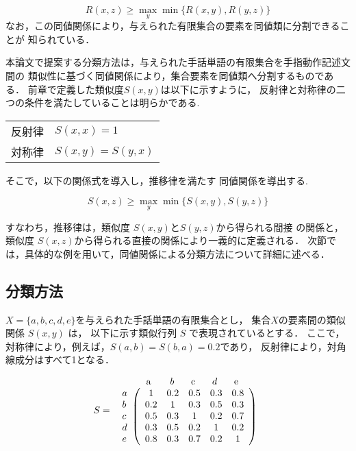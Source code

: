\[
 R(x,z) \ge \max_{y}\min\{R(x,y),R(y,z)\}
\]
なお，この同値関係により，与えられた有限集合の要素を同値類に分割できることが
知られている\cite{Klir1988}．

本論文で提案する分類方法は，与えられた手話単語の有限集合を手指動作記述文間の
類似性に基づく同値関係により，集合要素を同値類へ分割するものである．
前章で定義した類似度$S(x,y)$は以下に示すように，
反射律と対称律の二つの条件を満たしていることは明らかである.

\begin{center}
\begin{tabular}{ll}
反射律 & $S(x,x) = 1$\\
対称律 & $S(x,y) = S(y,x)$\\
\end{tabular}
\end{center}

そこで，以下の関係式を導入し，推移律を満たす
同値関係を導出する.

\begin{equation}
\label{eq:suii}
S(x,z) \ge \max_{y}\min\{S(x,y),S(y,z)\}
\end{equation}

すなわち，推移律は，類似度 $S(x,y)$と$S(y,z)$から得られる{\gt 間接}
の関係と，類似度 $S(x,z)$から得られる{\gt 直接}の関係により一義的に定義される．
次節では，具体的な例を用いて，同値関係による分類方法について詳細に述べる．

\subsection {分類方法}\label{tejun}

$X = \{a,b,c,d,e \}$を与えられた手話単語の有限集合とし，
集合$X$の要素間の類似関係 $S(x,y)$ は，
以下に示す類似行列 $S$ で表現されているとする．
ここで，対称律により，例えば，$S(a,b)=S(b,a)=0.2$であり，
反射律により，対角線成分はすべて1となる．

\[ S = 
\begin{array}{r@{}l}
& \begin{array}{ccccc}
\makebox[2.5em]{a}& b& \makebox[2.0em]{c}& d& \makebox[2.0em]{e}
\end{array}\\
\begin{array}{l}
a\\ b\\ c\\ d\\ e
\end{array} &
\left(
\begin{array}{ccccc}
1 & 0.2 & 0.5 & 0.3 & 0.8 \\
0.2 & 1 & 0.3 & 0.5 & 0.3 \\
0.5 & 0.3 & 1 & 0.2 & 0.7 \\
0.3 & 0.5 & 0.2 & 1 & 0.2 \\
0.8 & 0.3 & 0.7 & 0.2 & 1
\end{array}
\right)
\end{array}
\]

